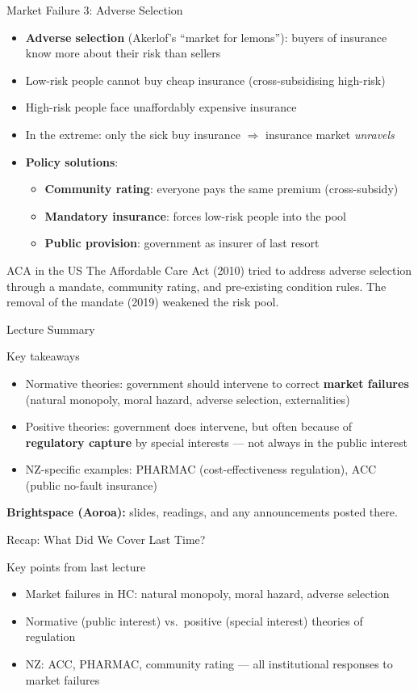 \documentclass[aspectratio=169, 12pt]{beamer}
\newcommand{\recapslide}[1]{%
  \begin{frame}{Recap: What Did We Cover Last Time?}
    \begin{block}{Key points from last lecture}
      \begin{itemize}#1\end{itemize}
    \end{block}
  \end{frame}}
\newcommand{\summaryside}[1]{%
  \begin{frame}{Lecture Summary}
    \begin{exampleblock}{Key takeaways}
      \begin{itemize}#1\end{itemize}
    \end{exampleblock}
    \vspace{0.5em}
    {\footnotesize\textcolor{OtagoGold}{\textbf{Brightspace (Aoroa):}} slides, readings, and any announcements posted there.}
  \end{frame}}
\begin{document}
\begin{frame}{Market Failure 3: Adverse Selection}
  \begin{itemize}
    \item \textbf{Adverse selection} (Akerlof's ``market for lemons''): buyers of insurance
          know more about their risk than sellers
    \item Low-risk people cannot buy cheap insurance (cross-subsidising high-risk)
    \item High-risk people face unaffordably expensive insurance
    \item In the extreme: only the sick buy insurance $\Rightarrow$ insurance market \emph{unravels}
    \item \textbf{Policy solutions}:
    \begin{itemize}
      \item \textbf{Community rating}: everyone pays the same premium (cross-subsidy)
      \item \textbf{Mandatory insurance}: forces low-risk people into the pool
      \item \textbf{Public provision}: government as insurer of last resort
    \end{itemize}
  \end{itemize}
  \begin{exampleblock}{ACA in the US}
    The Affordable Care Act (2010) tried to address adverse selection through a mandate, community
    rating, and pre-existing condition rules. The removal of the mandate (2019) weakened the
    risk pool.
  \end{exampleblock}
\end{frame}

\summaryside{
  \item Normative theories: government should intervene to correct \textbf{market failures} (natural monopoly, moral hazard, adverse selection, externalities)
  \item Positive theories: government does intervene, but often because of \textbf{regulatory capture} by special interests --- not always in the public interest
  \item NZ-specific examples: PHARMAC (cost-effectiveness regulation), ACC (public no-fault insurance)
}


\recapslide{
  \item Market failures in HC: natural monopoly, moral hazard, adverse selection
  \item Normative (public interest) vs.\ positive (special interest) theories of regulation
  \item NZ: ACC, PHARMAC, community rating --- all institutional responses to market failures
}
\end{document}
